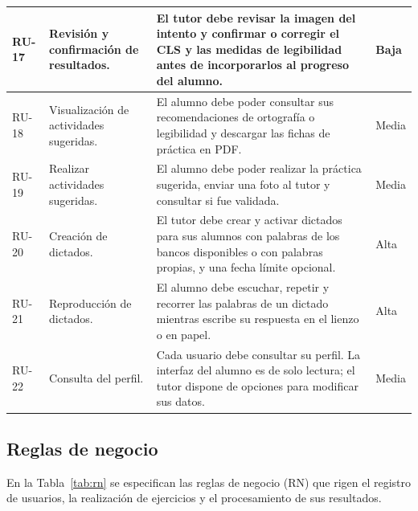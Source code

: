 \begin{longtable}{|>{\centering\arraybackslash}m{2cm}|m{3.6cm}|
  Y{\dimexpr\textwidth-7.6cm-8\arrayrulewidth\relax}|
  >{\centering\arraybackslash}m{2cm}|}
RU-17 &
Revisión y confirmación de resultados. &
El tutor debe revisar la imagen del intento y confirmar o corregir el CLS y las medidas de legibilidad antes de incorporarlos al progreso del alumno. &
Baja \\
\hline

RU-18 &
Visualización de actividades sugeridas. &
El alumno debe poder consultar sus recomendaciones de ortografía o legibilidad y descargar las fichas de práctica en PDF. &
Media \\
\hline

RU-19 &
Realizar actividades sugeridas. &
El alumno debe poder realizar la práctica sugerida, enviar una foto al tutor y consultar si fue validada. &
Media \\
\hline

RU-20 & Creación de dictados. &
El tutor debe crear y activar dictados para sus alumnos con palabras de los bancos disponibles o con palabras propias, y una fecha límite opcional. & Alta \\ \hline

RU-21 & Reproducción de dictados. &
El alumno debe escuchar, repetir y recorrer las palabras de un dictado mientras escribe su respuesta en el lienzo o en papel. & Alta \\ \hline

RU-22 & Consulta del perfil. &
Cada usuario debe consultar su perfil. La interfaz del alumno es de solo lectura; el tutor dispone de opciones para modificar sus datos. & Media \\ \hline

\end{longtable}


\subsection{Reglas de negocio}

En la Tabla~\ref{tab:rn} se especifican las reglas de negocio (RN) que rigen el registro de usuarios, la realización de ejercicios y el procesamiento de sus resultados.

